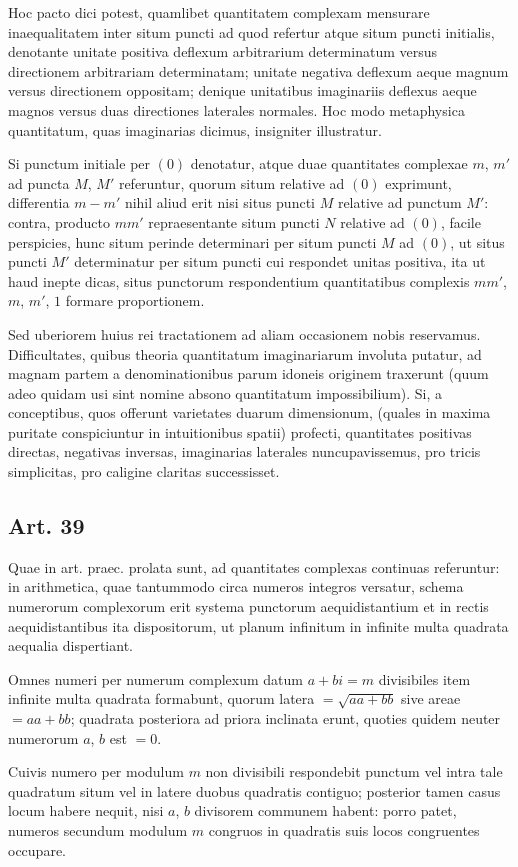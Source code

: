 \documentclass[12pt]{article}
\newcommand{\art}[1]{\subsection*{Art. #1}}
\begin{document}
Hoc pacto dici potest, quamlibet quantitatem complexam mensurare inaequalitatem inter situm puncti ad quod refertur atque situm puncti initialis, denotante unitate positiva deflexum arbitrarium determinatum versus directionem arbitrariam determinatam; unitate negativa deflexum aeque magnum versus directionem oppositam; denique unitatibus imaginariis deflexus aeque magnos versus duas directiones laterales normales. Hoc modo metaphysica quantitatum, quas imaginarias dicimus, insigniter illustratur.

Si punctum initiale per $(0)$ denotatur, atque duae quantitates complexae $m$, $m'$ ad puncta $M$, $M'$ referuntur, quorum situm relative ad $(0)$ exprimunt, differentia $m-m'$ nihil aliud erit nisi situs puncti $M$ relative ad punctum $M'$: contra, producto $mm'$ repraesentante situm puncti $N$ relative ad $(0)$, facile perspicies, hunc situm perinde determinari per situm puncti $M$ ad $(0)$, ut situs puncti $M'$ determinatur per situm puncti cui respondet unitas positiva, ita ut haud inepte dicas, situs punctorum respondentium quantitatibus complexis $mm'$, $m$, $m'$, $1$ formare proportionem.

Sed uberiorem huius rei tractationem ad aliam occasionem nobis reservamus. Difficultates, quibus theoria quantitatum imaginariarum involuta putatur, ad magnam partem a denominationibus parum idoneis originem traxerunt (quum adeo quidam usi sint nomine absono quantitatum impossibilium). Si, a conceptibus, quos offerunt varietates duarum dimensionum, (quales in maxima puritate conspiciuntur in intuitionibus spatii) profecti, quantitates positivas directas, negativas inversas, imaginarias laterales nuncupavissemus, pro tricis simplicitas, pro caligine claritas successisset.

\art{39}

Quae in art. praec. prolata sunt, ad quantitates complexas continuas referuntur: in arithmetica, quae tantummodo circa numeros integros versatur, schema numerorum complexorum erit systema punctorum aequidistantium et in rectis aequidistantibus ita dispositorum, ut planum infinitum in infinite multa quadrata aequalia dispertiant.

Omnes numeri per numerum complexum datum $a+bi=m$ divisibiles item infinite multa quadrata formabunt, quorum latera $=\sqrt{aa+bb}$ sive areae $=aa+bb$; quadrata posteriora ad priora inclinata erunt, quoties quidem neuter numerorum $a$, $b$ est $=0$.

Cuivis numero per modulum $m$ non divisibili respondebit punctum vel intra tale quadratum situm vel in latere duobus quadratis contiguo; posterior tamen casus locum habere nequit, nisi $a$, $b$ divisorem communem habent: porro patet, numeros secundum modulum $m$ congruos in quadratis suis locos congruentes occupare.
\end{document}
